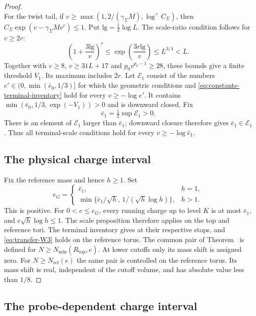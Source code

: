 \begin{proof}
\[\]
For the twist tail, if
$v\ge\max(1,2/(\gamma_\Sigma M),\log^+C_\Sigma)$,
then $C_\Sigma\exp(v-\gamma_\Sigma Mv^r)\le1$.
Put $\mathrm{lg}=\tfrac12\log L$.
The scale-ratio condition follows for $v\ge2r$:
\begin{equation}\label{eq:constants-scale-ratio}
 \left(1+\frac{3\mathrm{lg}}{v}\right)^r
        \le\exp\left(\frac{3r\mathrm{lg}}{v}\right)
        \le L^{3/4}<L.
\end{equation}
Together with $v\ge8$, $v\ge31L+17$ and
$p_0v^{p_0-1}\ge28$, these bounds give a finite
threshold $V_1$. Its maximum includes $2r$.
Let $\mathcal E_1$ consist of the numbers
$e'\in(0,\min(\bar e_0,1/3)]$ for which the geometric
conditions and \eqref{eq:constants-terminal-inventory}
hold for every $v\ge-\log e'$. It contains
$\min(\bar e_0,1/3,\exp(-V_1))>0$ and is downward closed.
Fix
\[
 \bar e_1=\tfrac12\sup\mathcal E_1>0.
\]
There is an element of $\mathcal E_1$ larger than $\bar e_1$;
downward closure therefore gives $\bar e_1\in\mathcal E_1$.
Thus all terminal-scale conditions hold for every
$v\ge-\log \bar e_1$.

\subsection{The physical charge interval}

Fix the reference mass and hence $h\ge1$. Set
\begin{equation}\label{eq:constants-physical-charge}
 e_G=
 \begin{cases}
 \bar e_1,&h=1,\\
 \min\{\bar e_1/\sqrt h,\,1/(\sqrt h\log h)\},&h>1.
 \end{cases}
\end{equation}
This is positive. For $0<e\le e_G$, every running charge
up to level $K$ is at most $\bar e_1$, and
$e\sqrt h\log h\le1$.
The scale proposition therefore applies on the top and
reference tori. The terminal inventory gives
 at their respective stops,
and \eqref{eq:transfer-W3} holds on the reference torus.
The common pair of Theorem~
is defined for $N\ge N_{\min}(R_{\mathrm{top}},e)$.
At lower cutoffs only its mass shift is assigned zero.
For $N\ge N_{\mathrm{ref}}(e)$ the same pair is
controlled on the reference torus. Its mass shift is real,
independent of the cutoff volume, and has absolute value
less than $1/8$.
\end{proof}

\subsection{The probe-dependent charge interval}

